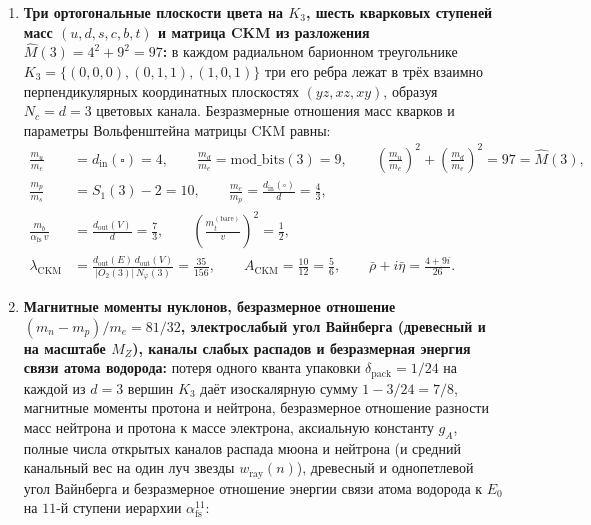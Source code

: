 \begin{theorem}
\begin{enumerate}[label=\textbf{(\arabic*)},leftmargin=*]
\begin{align}
    \sin^2\theta_{23}^{\mathrm{PMNS}} &= \frac{d_{\mathrm{out}}(V)}{N_\varphi(3)} \;=\; \frac{7}{13}, \label{eq:mono-pmns-23} \\
    \sin^2\theta_{13}^{\mathrm{PMNS}} &= \frac{1_{\mathrm{core}} + d_{\mathrm{in}}(V)}{S_3(3)} \;=\; \frac{2}{92} \;=\; \frac{1}{46}. \label{eq:mono-pmns-13}
  \end{align}
\item \textbf{Три ортогональные плоскости цвета на $K_3$, шесть кварковых ступеней масс $(u, d, s, c, b, t)$ и матрица CKM из разложения $\widehat{M}(3) = 4^2 + 9^2 = 97$:}
  в каждом радиальном барионном треугольнике $K_3 = \{(0,0,0), (0,1,1), (1,0,1)\}$ три его ребра лежат в трёх взаимно перпендикулярных координатных плоскостях $(yz, xz, xy)$, образуя $N_c = d = 3$ цветовых канала. Безразмерные отношения масс кварков и параметры Вольфенштейна матрицы CKM равны:
  \begin{align}
    \frac{m_u}{m_e} &= d_{\mathrm{in}}(\square) = 4, \qquad
    \frac{m_d}{m_e} = \mathrm{mod\_bits}(3) = 9, \qquad
    \left(\frac{m_u}{m_e}\right)^2 + \left(\frac{m_d}{m_e}\right)^2 = 97 = \widehat{M}(3), \label{eq:mono-quarks-ud} \\
    \frac{m_p}{m_s} &= S_1(3) - 2 = 10, \qquad
    \frac{m_c}{m_p} = \frac{d_{\mathrm{in}}(\square)}{d} = \frac{4}{3}, \label{eq:mono-quarks-sc} \\
    \frac{m_b}{\alpha_{\mathrm{fs}}\,v} &= \frac{d_{\mathrm{out}}(V)}{d} = \frac{7}{3}, \qquad
    \left(\frac{m_t^{(\mathrm{bare})}}{v}\right)^2 = \frac{1}{2}, \label{eq:mono-quarks-scbt} \\
    \lambda_{\mathrm{CKM}} &= \frac{d_{\mathrm{out}}(E)\,d_{\mathrm{out}}(V)}{|O_2(3)|\,N_\varphi(3)} = \frac{35}{156}, \qquad
    A_{\mathrm{CKM}} = \frac{10}{12} = \frac{5}{6}, \qquad
    \bar{\rho} + i\bar{\eta} = \frac{4 + 9i}{26}. \label{eq:mono-ckm-params}
  \end{align}
\item \textbf{Магнитные моменты нуклонов, безразмерное отношение $(m_n - m_p)/m_e = 81/32$, электрослабый угол Вайнберга (древесный и на масштабе $M_Z$), каналы слабых распадов и безразмерная энергия связи атома водорода:}
  потеря одного кванта упаковки $\delta_{\mathrm{pack}} = 1/24$ на каждой из $d = 3$ вершин $K_3$ даёт изоскалярную сумму $1 - 3/24 = 7/8$, магнитные моменты протона и нейтрона, безразмерное отношение разности масс нейтрона и протона к массе электрона, аксиальную константу $g_A$, полные числа открытых каналов распада мюона и нейтрона (и средний канальный вес на один луч звезды $w_{\mathrm{ray}}(n)$), древесный и однопетлевой угол Вайнберга и безразмерное отношение энергии связи атома водорода к $E_0$ на $11$-й ступени иерархии $\alpha_{\mathrm{fs}}^{11}$:

\end{enumerate}
\end{theorem}
